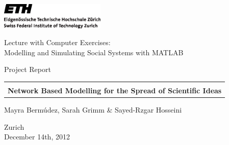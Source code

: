 
\thispagestyle{empty}

\begin{center}
\includegraphics[width=5cm]{ETHlogo.eps}

\bigskip


\bigskip


\bigskip


\LARGE{ 	Lecture with Computer Exercises:\\ }
\LARGE{ Modelling and Simulating Social Systems with MATLAB\\}

\bigskip

\bigskip

\small{Project Report}\\

\bigskip

\bigskip

\bigskip

\bigskip

\hspace*{-1.5cm}
\begin{tabular}{|c|}
\hline
\\
\textbf{\LARGE{Network Based Modelling for the Spread of Scientific Ideas}}\\ %
\hline
\end{tabular}
\bigskip

\bigskip

\bigskip

\LARGE{Mayra Berm\'udez, Sarah Grimm \& Sayed-Rzgar Hosseini}



\bigskip

\bigskip

\bigskip

\bigskip

\bigskip

\bigskip

\bigskip

\bigskip

Zurich\\

December 14th, 2012\\

\end{center}


